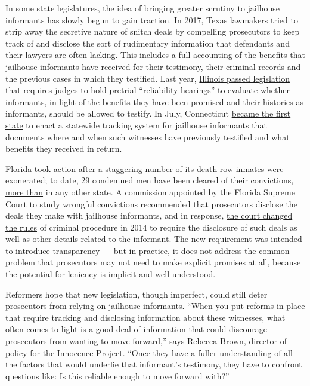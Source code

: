 In some state legislatures, the idea of bringing greater scrutiny to
jailhouse informants has slowly begun to gain traction.
\href{https://www.dallasnews.com/news/politics/2017/09/20/snitch-testimony-sent-innocent-man-to-prison-for-18-years-texas-lawmakers-hope-he-s-the-last/}{In
2017, Texas lawmakers} tried to strip away the secretive nature of
snitch deals by compelling prosecutors to keep track of and disclose the
sort of rudimentary information that defendants and their lawyers are
often lacking. This includes a full accounting of the benefits that
jailhouse informants have received for their testimony, their criminal
records and the previous cases in which they testified. Last year,
\href{https://www.usnews.com/news/politics/articles/2018-11-28/overriding-rauners-veto-illinois-passes-law-reforming-use-of-jailhouse-snitches}{Illinois
passed legislation} that requires judges to hold pretrial ``reliability
hearings'' to evaluate whether informants, in light of the benefits they
have been promised and their histories as informants, should be allowed
to testify. In July, Connecticut
\href{https://apnews.com/9f8858ef3fbf4965874d314ce41ec69c}{became the
first state} to enact a statewide tracking system for jailhouse
informants that documents where and when such witnesses have previously
testified and what benefits they received in return.

Florida took action after a staggering number of its death-row inmates
were exonerated; to date, 29 condemned men have been cleared of their
convictions,
\href{https://deathpenaltyinfo.org/state-and-federal-info/state-by-state/florida}{more
than} in any other state. A commission appointed by the Florida Supreme
Court to study wrongful convictions recommended that prosecutors
disclose the deals they make with jailhouse informants, and in response,
\href{https://www.news-journalonline.com/article/LK/20140615/News/605067010/DN}{the
court changed the rules} of criminal procedure in 2014 to require the
disclosure of such deals as well as other details related to the
informant. The new requirement was intended to introduce transparency
--- but in practice, it does not address the common problem that
prosecutors may not need to make explicit promises at all, because the
potential for leniency is implicit and well understood.

Reformers hope that new legislation, though imperfect, could still deter
prosecutors from relying on jailhouse informants. ``When you put reforms
in place that require tracking and disclosing information about these
witnesses, what often comes to light is a good deal of information that
could discourage prosecutors from wanting to move forward,'' says
Rebecca Brown, director of policy for the Innocence Project. ``Once they
have a fuller understanding of all the factors that would underlie that
informant's testimony, they have to confront questions like: Is this
reliable enough to move forward with?''

